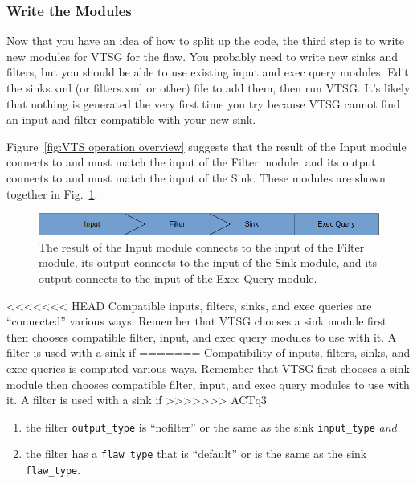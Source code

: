 \documentclass[12pt]{article}
\begin{document}
\subsubsection{Write the Modules}

Now that you have an idea of how to split up the code, the third step is to
write new modules for VTSG for the flaw.  You probably need to write new sinks
and filters, but you should be able to use existing input and exec query
modules.  Edit the sinks.xml (or filters.xml or other) file to add them,
then run VTSG.  It's likely that nothing is generated the very first time you
try because VTSG cannot find an input and filter compatible with your new sink.

\label{sec:connecting inputs, filters, and sinks}
Figure~\ref{fig:VTS operation overview} suggests that the result of the Input module
connects to and must match the input of the Filter module, and its output connects to
and must match the input of the Sink.  These modules are shown together in
Fig.~\ref{fig:input, filter, and sink}.
\begin{figure}[htbp]
  \centerline{\includegraphics[width=\linewidth]{fig_input_filter_sink.png}}
  \caption{The result of the Input module connects to the input of the Filter module,
    its output connects to the input of the Sink module, and its output connects
    to the input of the Exec Query module.
  }
  \label{fig:input, filter, and sink}
\end{figure}
<<<<<<< HEAD
Compatible inputs, filters, sinks, and exec queries are ``connected'' various
ways.  Remember that
VTSG chooses a sink module first then chooses compatible filter, input, and exec
query modules to
use with it.  A filter is used with a sink if
=======
Compatibility of inputs, filters, sinks, and exec queries is computed various
ways.  Remember that
VTSG first chooses a sink module then chooses compatible filter, input, and exec
query modules to
use with it.
\label{sec:compatible modules}
A filter is used with a sink if
>>>>>>> ACTq3
\begin{enumerate}[nosep]
\item the filter \verb|output_type| is ``nofilter'' or the same as the sink
  \verb|input_type| \emph{and}
\item the filter has a \verb|flaw_type| that is ``default'' or is the same as the
  sink \verb|flaw_type|.
\end{enumerate}
\end{document}
